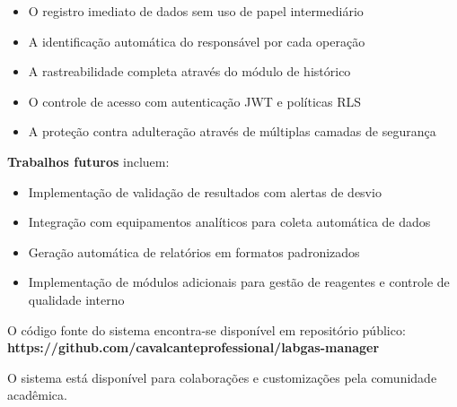 \documentclass[12pt,a4paper]{article}
\begin{document}
\begin{itemize}
\item O registro imediato de dados sem uso de papel intermediário
\item A identificação automática do responsável por cada operação
\item A rastreabilidade completa através do módulo de histórico
\item O controle de acesso com autenticação JWT e políticas RLS
\item A proteção contra adulteração através de múltiplas camadas de segurança
\end{itemize}

\textbf{Trabalhos futuros} incluem:

\begin{itemize}
\item Implementação de validação de resultados com alertas de desvio
\item Integração com equipamentos analíticos para coleta automática de dados
\item Geração automática de relatórios em formatos padronizados
\item Implementação de módulos adicionais para gestão de reagentes e controle de qualidade interno
\end{itemize}

O código fonte do sistema encontra-se disponível em repositório público: \textbf{https://github.com/cavalcanteprofessional/labgas-manager}

O sistema está disponível para colaborações e customizações pela comunidade acadêmica.




\end{document}
